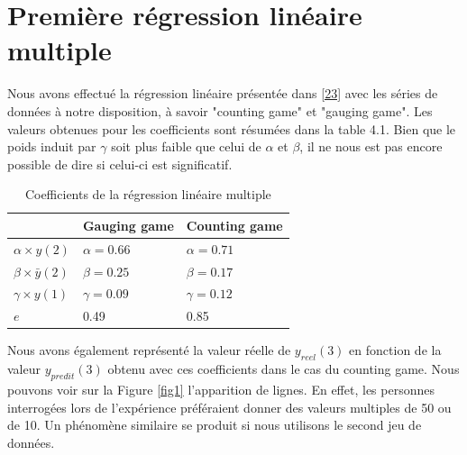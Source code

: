 \documentclass{scrreprt}
\begin{document}
\section{Première régression linéaire multiple}

Nous avons effectué la régression linéaire présentée dans \eqref{23} avec les  séries de données à notre disposition, à savoir "counting game" et "gauging game". Les valeurs obtenues pour les coefficients sont résumées dans la table 4.1. Bien que le poids induit par $\gamma$ soit plus faible que celui de $\alpha$ et $\beta$, il ne nous est pas encore possible de dire si celui-ci est significatif. \\

\begin{table}
	\begin{tabular}{|p{4cm}|p{4.5cm}|p{4.5cm}|}
		\hline
 & Gauging game & Counting game \tabularnewline
		\hline
$\alpha \times y(2)$ & $\alpha =  0.66$ & $\alpha = 0.71$ \tabularnewline
		\hline
$\beta \times \bar{y}(2)$ & $\beta = 0.25$ & $\beta =0.17$ \tabularnewline
		\hline
$\gamma \times y(1)$ & $\gamma = 0.09$  & $\gamma = 0.12$ \tabularnewline
		\hline
$e$ &  0.49 & 0.85 \tabularnewline
		\hline
	\end{tabular}
	\caption{Coefficients de la régression linéaire multiple}
\end{table}

 

Nous avons également représenté la valeur réelle de $y_{reel}(3)$ en fonction de la valeur $y_{predit}(3)$ obtenu avec ces coefficients dans le cas du counting game. Nous pouvons voir sur la Figure \ref{fig1} l'apparition de lignes. En effet, les personnes interrogées lors de l'expérience préféraient donner des valeurs multiples de 50 ou de 10. Un phénomène similaire se produit si nous utilisons le second jeu de données.\\

  
\end{document}
